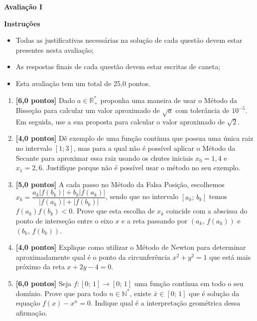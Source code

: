 \documentclass[12pt,a4paper]{article}
\begin{document}
\begin{center}
 \textbf{Avaliação I}
\end{center}

\textbf{Instruções}
\begin{itemize}
 \item Todas as justificativas necessárias na solução de cada questão devem estar presentes nesta avaliação;
 \item As respostas finais de cada questão devem estar escritas de caneta;
 \item Esta avaliação tem um total de 25,0 pontos.
\end{itemize}

\begin{enumerate}
 \item \textbf{[6,0 pontos]} Dado $a\in\mathbb{R}_+^*$ proponha uma maneira de usar o Método da Bisseção para calcular um valor aproximado de $\sqrt{a}$ com tolerância de $10^{-5}$. Em seguida, use a sua 
proposta para calcular o valor aproximado de $\sqrt{2}$.

 \item \textbf{[4,0 pontos]} Dê exemplo de uma função contínua que possua uma única raiz no intervalo $[1; 3]$, mas para a qual não é possível 
aplicar o Método da Secante para aproximar essa raiz usando os chutes iniciais 
$x_0 = 1,4$ e $x_1 = 2,6$. Justifique porque não é possível usar o método no seu exemplo.
 
 \item \textbf{[5,0 pontos]} A cada passo no Método da Falsa Posição, escolhemos $x_k = \dfrac{a_k|f(b_k)| + b_k|f(a_k)|}{|f(a_k)|+|f(b_k)|}$, sendo que no intervalo $[a_k;\,b_k]$ temos $f(a_k)f(b_k)<0$. Prove que 
 esta escolha de $x_k$ coincide com a abscissa do ponto de interseção entre o eixo $x$ e a reta passando por $(a_k,\,f(a_k))$ e $(b_k,\,f(b_k))$.

 \item \textbf{[4,0 pontos]} Explique como utilizar o Método de Newton para determinar aproximadamente qual é o ponto da circunferência 
$x^2 + y^2 = 1$ que está mais próximo da reta $x + 2y - 4 = 0$.

 \item \textbf{[6,0 pontos]} Seja $f:[0;\, 1]\to [0;\,1]$ uma função contínua em todo o seu domínio. Prove que para todo $n\in\mathbb{N}^*$, existe $\bar{x}\in[0;\,1]$ que é 
 solução da equação $f(x) - x^n = 0$. Indique qual é a interpretação geométrica dessa afirmação.

\end{enumerate}
\end{document}
